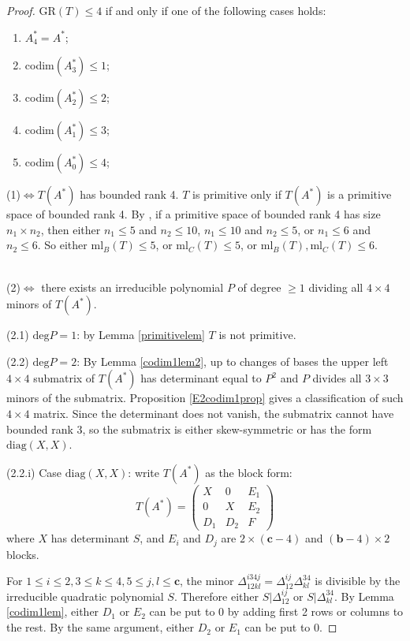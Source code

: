 \documentclass[10pt]{article} %
\newcommand{\bbb}{\mathbf{b}}
\newcommand{\ccc}{\mathbf{c}}
\newcommand{\ml}{\mathrm{ml}}
\theoremstyle{definition}
\begin{document}
\begin{proof}
$\mathrm{GR}(T)\leq 4$ if and only if one of the following cases holds:
\begin{enumerate}[(1)]
    \item $A^*_4=A^*$;
    \item codim$(A^*_3)\leq1$;
    \item codim$(A^*_2)\leq2$;
    \item codim$(A^*_1)\leq3$;
    \item codim$(A^*_0)\leq4$;
\end{enumerate}

(1)$\iff T(A^*)$ has bounded rank 4. $T$ is primitive only if $T(A^*)$ is a primitive space of bounded rank 4. By \cite{Atk83}, if a primitive space of bounded rank 4 has size $n_1\times n_2$, then either $n_1\leq5$ and $n_2\leq 10$, $n_1\leq10$ and $n_2\leq 5$, or $n_1\leq6$ and $n_2\leq 6$. So either $\ml_B(T)\leq 5$, or $\ml_C(T)\leq 5$, or $\ml_B(T),\ml_C(T)\leq 6$.

~\\
(2)$\iff$ there exists an irreducible polynomial $P$ of degree $\geq 1$ dividing all $4\times 4$ minors of $T(A^*)$. 

(2.1) $\mathrm{deg}P=1$: by Lemma \ref{primitivelem} $T$ is not primitive.
 
(2.2) $\mathrm{deg}P=2$: 
By Lemma \ref{codim1lem2}, up to changes of bases the upper left $4\times4$ submatrix of $T(A^*)$ has determinant equal to $P^2$ and $P$ divides all $3\times 3$ minors of the submatrix. Proposition \ref{E2codim1prop} gives a classification of such $4\times 4$ matrix. Since the determinant does not vanish, the submatrix cannot have bounded rank 3, so the submatrix is either skew-symmetric or has the form $\mathrm{diag}(X,X)$.

(2.2.i) Case $\mathrm{diag}(X,X)$: write $T(A^*)$ as the block form:
$$T(A^*)=\begin{pmatrix}
X & 0 & E_1\\
0 & X & E_2\\
D_1 & D_2 & F
\end{pmatrix}$$
where $X$ has determinant $S$, and $E_i$ and $D_j$ are $2\times (\ccc-4)$ and $(\bbb-4)\times 2$ blocks. 

For $1\leq i\leq 2, 3\leq k\leq 4, 5\leq j,l\leq \ccc$, the minor $\Delta^{i34j}_{12kl}=\Delta^{ij}_{12}\Delta^{34}_{kl}$ is divisible by the irreducible quadratic polynomial $S$. Therefore either $S|\Delta^{ij}_{12}$ or $S|\Delta^{34}_{kl}$. By Lemma \ref{codim1lem}, either $D_1$ or $E_2$ can be put to 0 by adding first 2 rows or columns to the rest. By the same argument, either $D_2$ or $E_1$ can be put to 0.


\end{proof}
\end{document}
